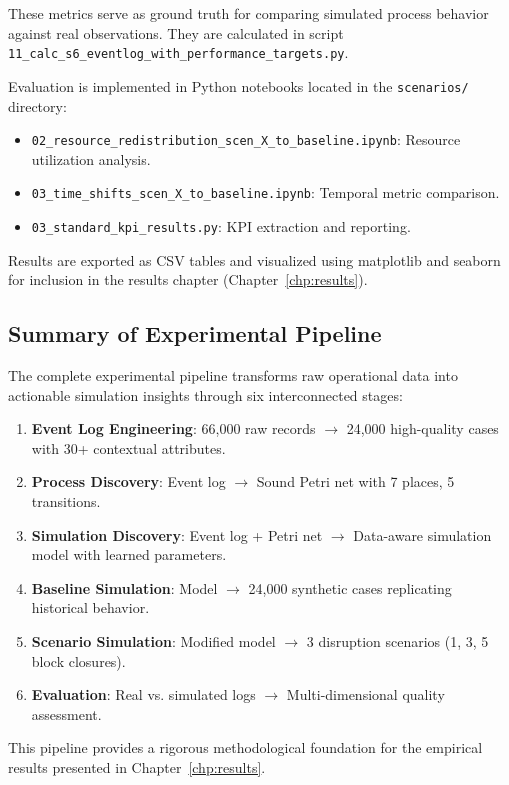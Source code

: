         These metrics serve as ground truth for comparing simulated process behavior against real observations. They are calculated in script \texttt{11\_calc\_s6\_eventlog\_with\_performance\_targets.py}.

        Evaluation is implemented in Python notebooks located in the \texttt{scenarios/} directory:
        
        \begin{itemize}
            \item \texttt{02\_resource\_redistribution\_scen\_X\_to\_baseline.ipynb}: Resource utilization analysis.
            \item \texttt{03\_time\_shifts\_scen\_X\_to\_baseline.ipynb}: Temporal metric comparison.
            \item \texttt{03\_standard\_kpi\_results.py}: KPI extraction and reporting.
        \end{itemize}
        
        Results are exported as CSV tables and visualized using matplotlib and seaborn for inclusion in the results chapter (Chapter~\ref{chp:results}).

\subsection{Summary of Experimental Pipeline}

The complete experimental pipeline transforms raw operational data into actionable simulation insights through six interconnected stages:

\begin{enumerate}
    \item \textbf{Event Log Engineering}: 66,000 raw records $\rightarrow$ 24,000 high-quality cases with 30+ contextual attributes.
    \item \textbf{Process Discovery}: Event log $\rightarrow$ Sound Petri net with 7 places, 5 transitions.
    \item \textbf{Simulation Discovery}: Event log + Petri net $\rightarrow$ Data-aware simulation model with learned parameters.
    \item \textbf{Baseline Simulation}: Model $\rightarrow$ 24,000 synthetic cases replicating historical behavior.
    \item \textbf{Scenario Simulation}: Modified model $\rightarrow$ 3 disruption scenarios (1, 3, 5 block closures).
    \item \textbf{Evaluation}: Real vs. simulated logs $\rightarrow$ Multi-dimensional quality assessment.
\end{enumerate}

This pipeline provides a rigorous methodological foundation for the empirical results presented in Chapter~\ref{chp:results}.